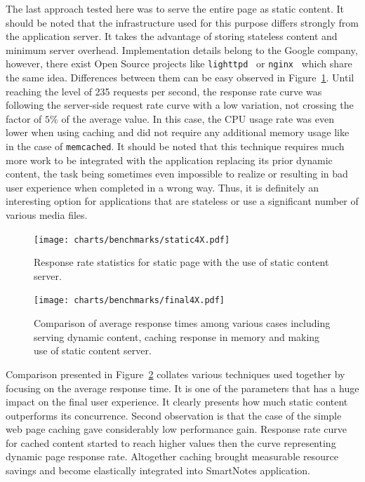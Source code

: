 The last approach tested here was to serve the entire page as static content. It should be noted that the infrastructure used for this purpose differs strongly from the application server. It takes the advantage of storing stateless content and minimum server overhead. Implementation details belong to the Google company, however, there exist Open Source projects like \texttt{lighttpd}~\cite{lighthttp_tool} or \texttt{nginx}~\cite{nginx_tool} which share the same idea. Differences between them can be easy observed in Figure~\ref{fig:sm_benchmark_static}. Until reaching the level of 235 requests per second, the response rate curve was following the server-side request rate curve with a low variation, not crossing the factor of $5 \%$ of the average value. In this case, the CPU usage rate was even lower when using caching and did not require any additional memory usage like in the case of \texttt{memcached}. It should be noted that this technique requires much more work to be integrated with the application replacing its prior dynamic content, the task being sometimes even impossible to realize or resulting in bad user experience when completed in a wrong way. Thus, it is definitely an interesting option for applications that are stateless or use a significant number of various media files.            
 \begin{figure}[ht!]
  \begin{center}
              \texttt{[image: charts/benchmarks/static4X.pdf]}
  \end{center}
  \caption{Response rate statistics for static page with the use of static content server.}
\label{fig:sm_benchmark_static}
\end{figure}
\begin{figure}[ht!]
  \begin{center}
              \texttt{[image: charts/benchmarks/final4X.pdf]}
  \end{center}
  \caption{Comparison of average response times among various cases including serving dynamic content, caching response in memory and making use of static content server.}
              \label{fig:sm_resp_time_comapre}
\end{figure}

Comparison presented in Figure~\ref{fig:sm_resp_time_comapre} collates various techniques used together by focusing on the average response time. It is one of the parameters that has a huge impact on the final user experience. It clearly presents how much static content outperforms its concurrence. Second observation is that the case of the simple web page caching gave considerably low performance gain. Response rate curve for cached content started to reach higher values then the curve representing dynamic page response rate. Altogether caching brought measurable resource savings and become elastically integrated into SmartNotes application.  
